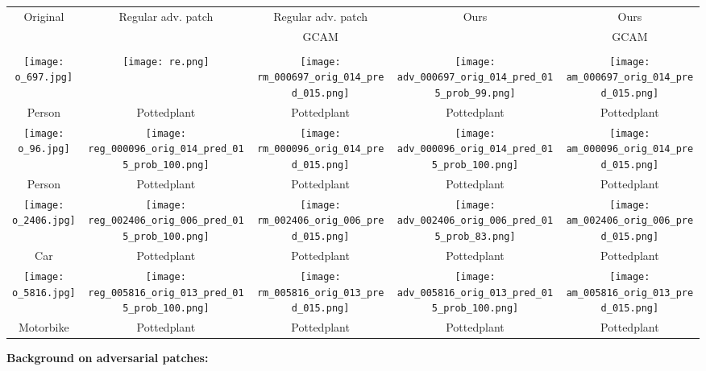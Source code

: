 \documentclass[10pt,twocolumn,letterpaper]{article}
\begin{document}
\begin{figure*}[h]
  \begin{center}
  \begin{tabular}{| c c c c c|}
    \hline
Original & Regular adv. patch & Regular adv. patch & Ours & Ours\\
 & & GCAM &  &GCAM\\
  \hline
\vspace{-.08in}
&&&&\\
\texttt{[image: o\_697.jpg]}&
\texttt{[image: re.png]}&
\texttt{[image: rm\_000697\_orig\_014\_pred\_015.png]}&
\texttt{[image: adv\_000697\_orig\_014\_pred\_015\_prob\_99.png]}&
\texttt{[image: am\_000697\_orig\_014\_pred\_015.png]}\\
Person & Pottedplant & Pottedplant & Pottedplant & Pottedplant \\
\texttt{[image: o\_96.jpg]}&
\texttt{[image: reg\_000096\_orig\_014\_pred\_015\_prob\_100.png]}&
\texttt{[image: rm\_000096\_orig\_014\_pred\_015.png]}&
\texttt{[image: adv\_000096\_orig\_014\_pred\_015\_prob\_100.png]}&
\texttt{[image: am\_000096\_orig\_014\_pred\_015.png]}\\
Person & Pottedplant & Pottedplant & Pottedplant & Pottedplant \\
\texttt{[image: o\_2406.jpg]}&
\texttt{[image: reg\_002406\_orig\_006\_pred\_015\_prob\_100.png]}&
\texttt{[image: rm\_002406\_orig\_006\_pred\_015.png]}&
\texttt{[image: adv\_002406\_orig\_006\_pred\_015\_prob\_83.png]}&
\texttt{[image: am\_002406\_orig\_006\_pred\_015.png]}\\
Car & Pottedplant &Pottedplant & Pottedplant & Pottedplant \\
\texttt{[image: o\_5816.jpg]}&
\texttt{[image: reg\_005816\_orig\_013\_pred\_015\_prob\_100.png]}&
\texttt{[image: rm\_005816\_orig\_013\_pred\_015.png]}&
\texttt{[image: adv\_005816\_orig\_013\_pred\_015\_prob\_100.png]}&
\texttt{[image: am\_005816\_orig\_013\_pred\_015.png]}\\
Motorbike  & Pottedplant & Pottedplant & Pottedplant & Pottedplant\\
\hline

\end{tabular}
\vspace{.05in}
  \caption{Comparison of Grad-CAM visualization results for universal targeted patch attacks using our method (`Ours') vs regular adversarial patch (`AP'). The top-1 predicted label is written under each image, the universal attack was successful for all VOC images, and Grad-CAM is always computed for the predicted category. The target category chosen was ``Pottedplant''.}
\label{fig_patch_universal}
  \end{center}

\end{figure*}
{\bf Background on adversarial patches:}
\end{document}
